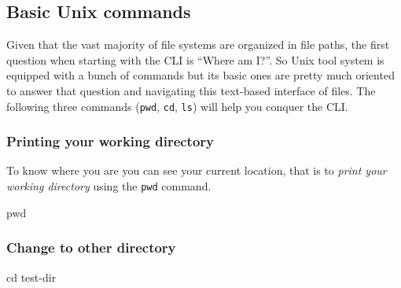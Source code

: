 \documentclass[
  letterpaper,
  DIV=11,
  numbers=noendperiod,
  oneside]{scrreprt}
\newenvironment{Shaded}{\begin{snugshade}}{\end{snugshade}}
\newcommand{\BuiltInTok}[1]{\textcolor[rgb]{0.00,0.23,0.31}{#1}}
\newcommand{\NormalTok}[1]{\textcolor[rgb]{0.00,0.23,0.31}{#1}}
\begin{document}
\hypertarget{basic-unix-commands}{%
\subsection{Basic Unix commands}\label{basic-unix-commands}}

Given that the vast majority of file systems are organized in file
paths, the first question when starting with the CLI is ``Where am I?''.
So Unix tool system is equipped with a bunch of commands but its basic
ones are pretty much oriented to answer that question and navigating
this text-based interface of files. The following three commands
(\texttt{pwd}, \texttt{cd}, \texttt{ls}) will help you conquer the CLI.

\hypertarget{printing-your-working-directory}{%
\subsubsection{Printing your working
directory}\label{printing-your-working-directory}}

To know where you are you can see your current location, that is to
\emph{print your working directory} using the \texttt{pwd} command.

\begin{Shaded}
\begin{Highlighting}[]
\BuiltInTok{pwd}
\end{Highlighting}
\end{Shaded}

\hypertarget{change-to-other-directory}{%
\subsubsection{Change to other
directory}\label{change-to-other-directory}}

\begin{Shaded}
\begin{Highlighting}[]
\BuiltInTok{cd}\NormalTok{ test{-}dir}
\end{Highlighting}
\end{Shaded}
\end{document}
